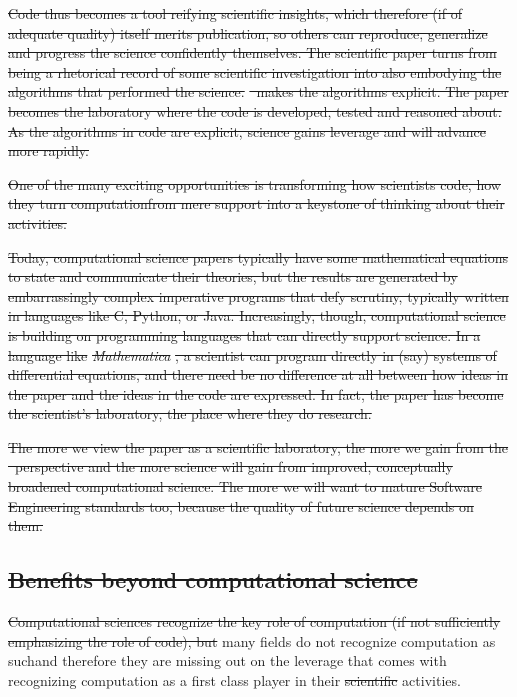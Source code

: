 \documentclass{comjnl}
\providecommand{\DIFadd}[1]{{\protect\color{blue}\uwave{#1}}} %
\providecommand{\DIFdel}[1]{{\protect\color{red}\sout{#1}}}                      %
\providecommand{\DIFaddbegin}{} %
\providecommand{\DIFaddend}{} %
\providecommand{\DIFdelbegin}{} %
\providecommand{\DIFdelend}{} %
\begin{document}
\DIFdel{Code thus becomes a tool reifying scientific insights, which therefore (if of adequate quality) itself merits publication, so others can reproduce, generalize and progress the science confidently themselves. The scientific paper turns from being a rhetorical record of some scientific investigation into also embodying the algorithms that performed the science. }%
\DIFdel{\ makes the algorithms explicit. The paper becomes the laboratory where the code is developed, tested and reasoned about. As the algorithms in code are explicit, science gains leverage and will advance more rapidly.
}%

\DIFdel{One of the many exciting opportunities is transforming how scientists code, how they turn computationfrom mere support into a keystone of thinking about their activities. 
}%

\DIFdel{Today, computational science papers typically have some mathematical equations to state and communicate their theories, but the results are generated by embarrassingly complex imperative programs that defy scrutiny, typically written in languages like C, Python, or Java. Increasingly, though, computational science is building on programming languages that can directly support science. In a language like }\emph{\DIFdel{Mathematica}}%
\DIFdel{, a scientist can program directly in (say) systems of differential equations, and there need be no difference at all between how ideas in the paper and the ideas in the code are expressed. In fact, the paper has become the scientist's laboratory, the place where they do research.
}%

\DIFdel{The more we view the paper as a scientific laboratory, the more we gain from the }%
\DIFdel{\ perspective and the more science will gain from improved, conceptually broadened computational science. The more we will want to mature Software Engineering standards too, because the quality of future science depends on them.
}%

\subsection{\DIFdel{Benefits beyond computational science}}
\addtocounter{subsection}{-1}%
\DIFdel{Computational sciences recognize the key role of computation (if not sufficiently emphasizing the role of code), but }\DIFdelend \DIFaddbegin \DIFadd{and computation, but }\DIFaddend many fields do not recognize computation as such\DIFaddbegin \DIFadd{, as a skilled discipline, }\DIFaddend and therefore they are missing out on the leverage that comes with recognizing computation as a first class player in their  \DIFdelbegin \DIFdel{scientific }\DIFdelend activities. 
\end{document}
